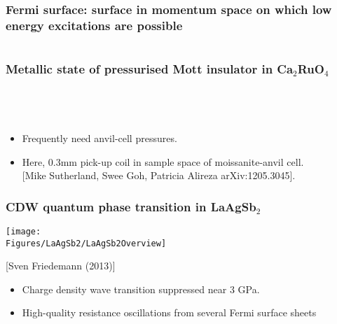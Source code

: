 \begin{frame}[label=FermiSurface]
  \frametitle{Fermi surface: surface in momentum space on which low energy excitations are possible}

\begin{columns}[t]

\end{columns}

\end{frame}



\begin{frame}
\frametitle{Metallic state of pressurised Mott insulator in Ca$_2$RuO$_4$}
\begin{columns}[t]
\centerline{~}
\centerline{~}
\end{columns}
\begin{itemize}
\item{Frequently need anvil-cell pressures.}
\item <2->Here, 0.3mm pick-up coil in sample space of moissanite-anvil
  cell.\\ {\small[Mike Sutherland, Swee Goh, Patricia Alireza arXiv:1205.3045].}
\end{itemize}
\end{frame}




\begin{frame}
\frametitle{CDW quantum phase transition in LaAgSb$_2$}
\centerline{\texttt{[image: \\Figures/LaAgSb2/LaAgSb2Overview]}}
\centerline{\small[Sven Friedemann (2013)]}
\begin{itemize}
\item{Charge density wave transition suppressed near 3 GPa.}
\item {High-quality resistance oscillations from several Fermi surface sheets}
\end{itemize}
\end{frame}


